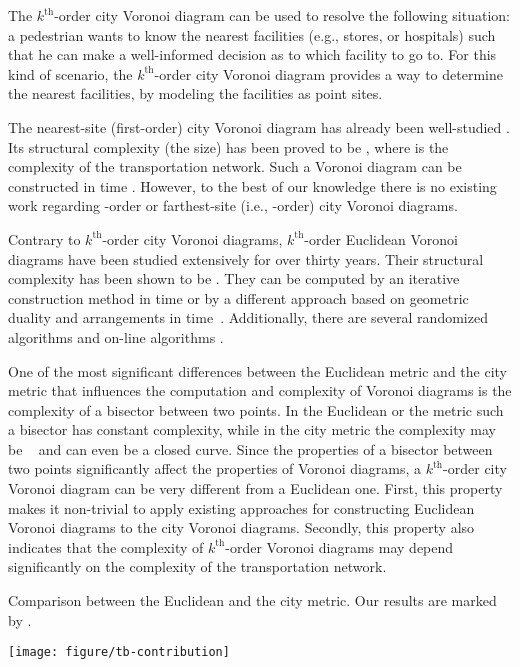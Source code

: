 \documentclass[11pt]{llncs}
\newcommand{\kth}{\ensuremath{k^{\mathrm{th}}}\xspace}
\newcommand{\kthorder}{\kth-order\xspace}
\begin{document}
The \kthorder city Voronoi diagram can be used to resolve the following situation:
a pedestrian wants to know the  nearest facilities (e.g.,  stores, or  hospitals)
such that he can make a well-informed decision as to which facility to go to.
For this kind of scenario,
the \kthorder city Voronoi diagram
provides a way to determine the  nearest facilities, by modeling the facilities as point sites.





The nearest-site (first-order) city Voronoi diagram
has already been well-studied \cite{AAP-04,BC-05,BKC-09,GSW-08}.
Its structural complexity (the size)
has been proved to be  \cite{AAP-04},
where  is the complexity of the transportation network.
Such a Voronoi diagram can be constructed in  time \cite{BKC-09}.
However, to the best of our knowledge
there is no existing work regarding -order
or farthest-site (i.e., -order) city Voronoi diagrams.


Contrary to \kthorder city Voronoi diagrams,
\kthorder Euclidean Voronoi diagrams
have been studied extensively for over thirty years.
Their structural complexity has been shown to be  \cite{Lee-82}.
They can be computed by an iterative construction method in  time \cite{Lee-82}
or by a different approach based on geometric duality and arrangements in  time~\cite{CE-87}.
Additionally, there are several randomized algorithms \cite{ABMS-98,Mulmuley-91}
and on-line algorithms \cite{AS-92,BDT-93}.



One of the most significant differences between the Euclidean metric and the city metric that influences the computation and complexity of Voronoi diagrams is the complexity of a bisector between two points.
In the Euclidean or the  metric such a bisector has constant complexity, while in the city metric the complexity may be ~\cite{AAP-04} and can even be a closed curve.
Since the properties of a bisector between two points significantly affect the properties of Voronoi diagrams,
a \kthorder city Voronoi diagram can be very different from a Euclidean one.
First, this property makes it non-trivial to apply existing approaches for constructing Euclidean Voronoi diagrams to the city Voronoi diagrams.
Secondly, this property also indicates that the complexity of \kthorder Voronoi diagrams may depend significantly on the complexity of the transportation network.

\begin{table}[tb]
\caption{\small{Comparison between the Euclidean and the city metric. Our results are marked by .}}\label{tb-comparison}
\centering
\hspace*{-1.2 cm}\texttt{[image: figure/tb-contribution]}
\end{table}
\end{document}
